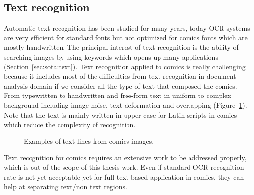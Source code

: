 \subsection{Text recognition} %
\label{sub:in:text_recognition}
Automatic text recognition has been studied for many years, today OCR systems are very efficient for standard fonts but not optimized for comics fonts which are mostly handwritten.
The principal interest of text recognition is the ability of searching images by using keywords which opens up many applications (Section~\ref{sec:sota:text}).
Text recognition applied to comics is really challenging because it includes most of the difficulties from text recognition in document analysis domain if we consider all the type of text that composed the comics.
From typewritten to handwritten and free-form text in uniform to complex background including image noise, text deformation and overlapping (Figure~\ref{fig:in:texlines_example}).
Note that the text is mainly written in upper case for Latin scripts in comics which reduce the complexity of recognition.

 \begin{figure}[!ht]  %
   \centering
  \caption[Examples of text lines from comics images]{Examples of text lines from comics images.}
  \label{fig:in:texlines_example}
 \end{figure}

Text recognition for comics requires an extensive work to be addressed properly, which is out of the scope of this thesis work.
Even if standard OCR recognition rate is not yet acceptable yet for full-text based application in comics, they can help at separating text/non text regions.


